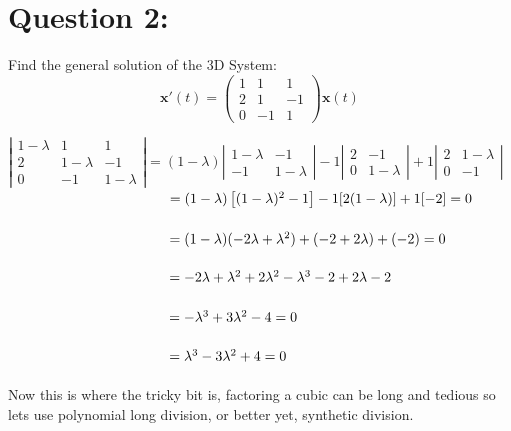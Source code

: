 \documentclass[12pt]{article}
\begin{document}
\vspace{10cm}
\section*{Question 2:}
Find the general solution of the 3D System:
\renewcommand{\arraystretch}{1}
$$\mathbf{x'}(t) = \begin{pmatrix} 1 & 1 & 1 \\ 2 & 1 & -1 \\ 0 & -1 & 1 \end{pmatrix} \mathbf{x}(t)$$

$\left| \begin{array}{ccc} 1-\lambda & 1 & 1\\ 2 & 1-\lambda & -1 \\ 0 & -1 & 1-\lambda\end{array}\right|
= (1-\lambda)\left| \begin{array}{cc} 1-\lambda & -1\\ -1 & 1-\lambda\end{array}\right| 
          - 1\left| \begin{array}{cc} 2 & -1 \\ 0 & 1-\lambda\end{array}\right| 
          + 1\left| \begin{array}{cc} 2 & 1-\lambda\\ 0 & -1\end{array}\right|$ \\
$\hspace*{115pt} = (1-\lambda)\left[(1-\lambda)^2 - 1\right] - 1[2(1-\lambda)] + 1[-2]=0$ \\\\
$\hspace*{115pt} = (1-\lambda)(-2\lambda + \lambda^2) + (-2+2\lambda) + (-2)=0$ \\\\
$\hspace*{115pt} = -2\lambda + \lambda^2 + 2\lambda^2 - \lambda^3 - 2 + 2\lambda - 2$ \\\\
$\hspace*{115pt} = -\lambda^3 + 3\lambda^2 - 4 = 0$ \\\\
$\hspace*{115pt} = \lambda^3 - 3\lambda^2 + 4 = 0$ \\\\
Now this is where the tricky bit is, factoring a cubic can be long and tedious
so lets use polynomial long division, or better yet, synthetic division. 
\end{document}
